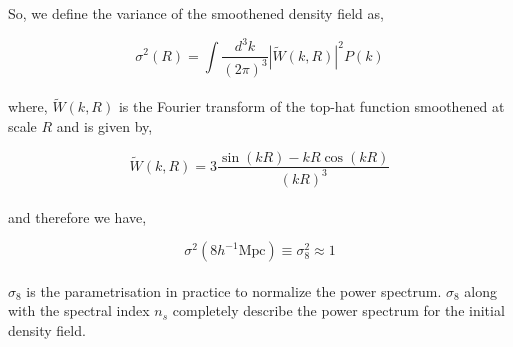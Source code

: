 So, we define the variance of the smoothened density field as,

\begin{equation}
	\sigma^2(R) = \int \dfrac{d^3k}{(2\pi)^3} |\tilde{W}(k,R)|^2 P(k)
\end{equation}
\\
where, $\tilde{W}(k,R)$ is the Fourier transform of the top-hat function smoothened 
at scale $R$ and is given by,

\begin{equation}
	\tilde{W}(k,R) = 3\dfrac{\sin(kR) - kR \cos(kR)}{(kR)^3}
\end{equation}
\\
and therefore we have,

\begin{equation}
	\sigma^2(8 h^{-1} \mathrm{Mpc}) \equiv \sigma_8^2 \approx 1
\end{equation}
\\
$\sigma_8$ is the parametrisation in practice to normalize the power
spectrum. $\sigma_8$ along with the spectral index $n_s$ completely
describe the power spectrum for the initial density field.

